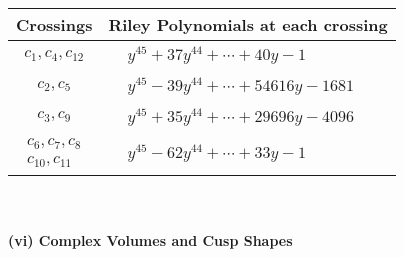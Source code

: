 \documentclass[1p]{elsarticle_modified}
\theoremstyle{definition}
\begin{document}
\begin{tabular}{m{50pt}|m{274pt}}
Crossings & \hspace{64pt}Riley Polynomials at each crossing \\
\hline $$\begin{aligned}c_{1},c_{4},c_{12}\end{aligned}$$&$\begin{aligned}
&y^{45}+37 y^{44}+\cdots+40 y-1
\end{aligned}$\\
\hline $$\begin{aligned}c_{2},c_{5}\end{aligned}$$&$\begin{aligned}
&y^{45}-39 y^{44}+\cdots+54616 y-1681
\end{aligned}$\\
\hline $$\begin{aligned}c_{3},c_{9}\end{aligned}$$&$\begin{aligned}
&y^{45}+35 y^{44}+\cdots+29696 y-4096
\end{aligned}$\\
\hline $$\begin{aligned}c_{6},c_{7},c_{8}\\c_{10},c_{11}\end{aligned}$$&$\begin{aligned}
&y^{45}-62 y^{44}+\cdots+33 y-1
\end{aligned}$\\
\hline
\end{tabular}\\~\\
\newpage\flushleft \textbf{(vi) Complex Volumes and Cusp Shapes}
\end{document}
